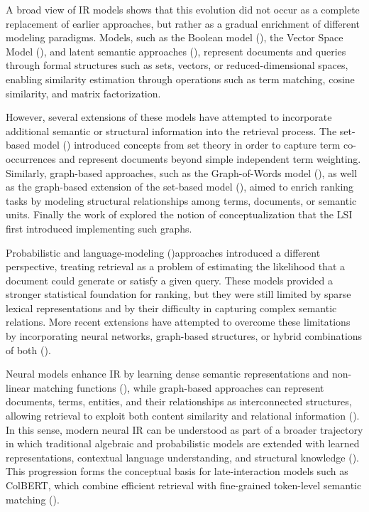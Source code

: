 \documentclass[preprint,5p,times,twocolumn,authoryear]{elsarticle}
\begin{document}
A broad view of IR models shows that this evolution did not occur as a complete replacement of earlier approaches, but rather as a gradual enrichment of different modeling paradigms. Models, such as the Boolean model (\cite{bool}), the Vector Space Model (\cite{salton_vector_1975}), and latent semantic approaches (\cite{lsi}), represent documents and queries through formal structures such as sets, vectors, or reduced-dimensional spaces, enabling similarity estimation through operations such as term matching, cosine similarity, and matrix factorization. 

However, several extensions of these models have attempted to incorporate additional semantic or structural information into the retrieval process. The set-based model (\cite{setbase1}) introduced concepts from set theory in order to capture term co-occurrences and represent documents beyond simple independent term weighting. Similarly, graph-based approaches, such as the Graph-of-Words model (\cite{gow}), as well as the graph-based extension of the set-based model (\cite{kalogeropoulos2025}), aimed to enrich ranking tasks by modeling structural relationships among terms, documents, or semantic units. Finally the work of \cite{KALOGEROPOULOS_concepts} explored the notion of conceptualization that the LSI first introduced implementing such graphs.  

Probabilistic and language-modeling (\cite{ponte1998language})approaches introduced a different perspective, treating retrieval as a problem of estimating the likelihood that a document could generate or satisfy a given query. These models provided a stronger statistical foundation for ranking, but they were still limited by sparse lexical representations and by their difficulty in capturing complex semantic relations. More recent extensions have attempted to overcome these limitations by incorporating neural networks, graph-based structures, or hybrid combinations of both (\cite{bm25,robertson2009probabilistic}).


Neural models enhance IR by learning dense semantic representations and non-linear matching functions (\cite{huang2013learning,guo2016deep,mitra2018introduction,Xiong_2017}), while graph-based approaches can represent documents, terms, entities, and their relationships as interconnected structures, allowing retrieval to exploit both content similarity and relational information (\cite{rousseau2013graph,kalogeropoulos2025}). In this sense, modern neural IR can be understood as part of a broader trajectory in which traditional algebraic and probabilistic models are extended with learned representations, contextual language understanding, and structural knowledge (\cite{mitra2018introduction,bert}). This progression forms the conceptual basis for late-interaction models such as ColBERT, which combine efficient retrieval with fine-grained token-level semantic matching (\cite{colbert}).
\end{document}
